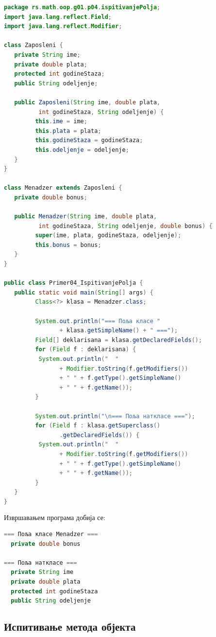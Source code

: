 \begin{lstlisting}[language=Java]
package rs.math.oop.g01.p04.ispitivanjePolja;
import java.lang.reflect.Field;
import java.lang.reflect.Modifier;
 
class Zaposleni {
   private String ime;
   private double plata;
   protected int godineStaza;
   public String odeljenje;
 
   public Zaposleni(String ime, double plata,
          int godineStaza, String odeljenje) {
         this.ime = ime;
         this.plata = plata;
         this.godineStaza = godineStaza;
         this.odeljenje = odeljenje;
   }
}
 
class Menadzer extends Zaposleni {
   private double bonus;
 
   public Menadzer(String ime, double plata,
          int godineStaza, String odeljenje, double bonus) {
         super(ime, plata, godineStaza, odeljenje);
         this.bonus = bonus;
   }
}
 
public class Primer04_IspitivanjePolja {
   public static void main(String[] args) {
         Class<?> klasa = Menadzer.class;
 
         System.out.println("=== Поља класе "
                + klasa.getSimpleName() + " ===");
         Field[] deklarisana = klasa.getDeclaredFields();
         for (Field f : deklarisana) {
          System.out.println("  "
                + Modifier.toString(f.getModifiers())
                + " " + f.getType().getSimpleName()
                + " " + f.getName());
         }
 
         System.out.println("\n=== Поља наткласе ===");
         for (Field f : klasa.getSuperclass()
                .getDeclaredFields()) {
          System.out.println("  "
                + Modifier.toString(f.getModifiers())
                + " " + f.getType().getSimpleName()
                + " " + f.getName());
         }
   }
}
\end{lstlisting}


Извршавањем програма добија се:

\begin{lstlisting}[language=Java]
=== Поља класе Menadzer ===
  private double bonus
 
=== Поља наткласе ===
  private String ime
  private double plata
  protected int godineStaza
  public String odeljenje
\end{lstlisting}

\subsection{Испитивање метода објекта}

